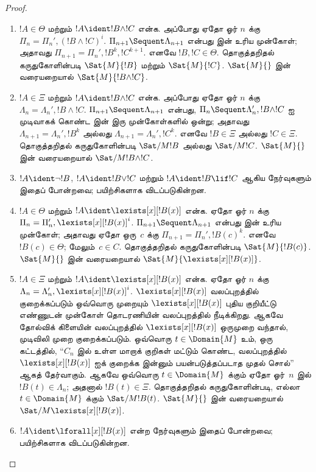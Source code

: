 \documentclass[../../../include/open-logic-section]{subfiles}
\begin{document}
\begin{proof}
\begin{enumerate}
  \item $!A \in \Theta$ மற்றும் $!A \ident !B \land !C$
  என்க. அப்போது ஏதோ ஓர் $n$ க்கு
  $\Pi_n = \Pi_n', (!B \land !C)^i$.
  $\Pi_{n+1} \Sequent \Lambda_{n+1}$ என்பது
  \LeftR{\land} இன் உரிய முன்கோள்; அதாவது
  $\Pi_{n+1} = \Pi_n', !B^k, !C^{k+1}$.
  எனவே $!B, !C \in \Theta$. தொகுத்தறிதல்
  கருதுகோளின்படி $\Sat{M}{!B}$ மற்றும் $\Sat{M}{!C}$.
  $\Sat{M}{}$ இன் வரையறையால்
  $\Sat{M}{!B \land !C}$.

  \item $!A \in \Xi$ மற்றும் $!A \ident !B \land !C$
  என்க. அப்போது ஏதோ ஓர் $n$ க்கு
  $\Lambda_n = \Lambda_n', !B \land !C$.
  $\Pi_{n+1} \Sequent \Lambda_{n+1}$ என்பது,
  $\Pi_n \Sequent \Lambda'_n, !B \land !C$
  ஐ முடிவாகக் கொண்ட \RightR{\land} இன் இரு
  முன்கோள்களில் ஒன்று; அதாவது
  $\Lambda_{n+1} = \Lambda_n', !B^k$ அல்லது
  $\Lambda_{n+1} = \Lambda_n', !C^k$.
  எனவே $!B \in \Xi$ அல்லது $!C \in \Xi$.
  தொகுத்தறிதல் கருதுகோளின்படி
  $\Sat/{M}{!B}$ அல்லது $\Sat/{M}{!C}$.
  $\Sat{M}{}$ இன் வரையறையால்
  $\Sat/{M}{!B \land !C}$.

  \item $!A \ident \lnot !B$,
  $!A \ident !B \lor !C$ மற்றும்
  $!A \ident !B \lif !C$ ஆகிய நேர்வுகளும்
  இதைப் போன்றவை; பயிற்சிகளாக விடப்படுகின்றன.

  \item $!A \in \Theta$ மற்றும்
  $!A \ident \lexists[x][!B(x)]$ என்க.
  ஏதோ ஓர் $n$ க்கு
  $\Pi_n = \Pi_n', \lexists[x][!B(x)]^i$.
  $\Pi_{n+1} \Sequent \Lambda_{n+1}$ என்பது
  \LeftR{\lexists} இன் உரிய முன்கோள்; அதாவது ஏதோ
  ஒரு~$c$ க்கு $\Pi_{n+1} = \Pi_n', !B(c)^k$.
  எனவே $!B(c) \in \Theta$; மேலும்~$c \in C$.
  தொகுத்தறிதல் கருதுகோளின்படி
  $\Sat{M}{!B(c)}$. $\Sat{M}{}$ இன்
  வரையறையால் $\Sat{M}{\lexists[x][!B(x)]}$.

  \item $!A \in \Xi$ மற்றும்
  $!A \ident \lexists[x][!B(x)]$ என்க.
  ஏதோ ஓர் $n$ க்கு
  $\Lambda_n = \Lambda_n', \lexists[x][!B(x)]^i$.
  $\lexists[x][!B(x)]$ வலப்புறத்தில் குறைக்கப்படும்
  ஒவ்வொரு முறையும் $\lexists[x][!B(x)]$ புதிய குறியீட்டு எண்ணுடன்
  முன்கோள் தொடரணியின் வலப்புறத்தில் நீடிக்கிறது.
  ஆகவே தோல்விக் கிளையின் வலப்புறத்தில் $\lexists[x][!B(x)]$ ஒருமுறை
  வந்தால், முடிவிலி முறை குறைக்கப்படும்.
  ஒவ்வொரு $t \in \Domain{M}$ உம், ஒரு கட்டத்தில்,
  ``$C_n$ இல் உள்ள மாறாக் குறிகள் மட்டும் கொண்ட,
  வலப்புறத்தில் $\lexists[x][!B(x)]$ ஐக் குறைக்க
  இன்னும் பயன்படுத்தப்படாத முதல் சொல்'' ஆகத் தேர்வாகும்.
  ஆகவே ஒவ்வொரு $t \in \Domain{M}$ க்கும்
  ஏதோ ஓர்~$n$ இல் $!B(t) \in \Lambda_n$;
  அதனால் $!B(t) \in \Xi$. தொகுத்தறிதல்
  கருதுகோளின்படி, எல்லா $t \in \Domain{M}$ க்கும்
  $\Sat/{M}{!B(t)}$. $\Sat{M}{}$ இன்
  வரையறையால் $\Sat/{M}{\lexists[x][!B(x)]}$.

  \item $!A \ident \lforall[x][!B(x)]$ என்ற
  நேர்வுகளும் இதைப் போன்றவை; பயிற்சிகளாக விடப்படுகின்றன.
\end{enumerate}
\end{proof}
\end{document}
